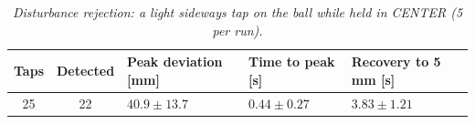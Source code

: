 \begin{table}[H]
\centering
\begin{tabularx}{\textwidth}{|c|c|X|X|X|}
\hline
\textbf{Taps} & \textbf{Detected} & \textbf{Peak deviation [mm]} & \textbf{Time to peak [s]} & \textbf{Recovery to 5\,mm [s]} \\ \hline
25 & 22 & $40.9 \pm 13.7$ & $0.44 \pm 0.27$ & $3.83 \pm 1.21$ \\ \hline
\end{tabularx}
\caption{\textit{Disturbance rejection: a light sideways tap on the ball while held in CENTER (5 per run).}}
\label{tab:test_disturb}
\end{table}
